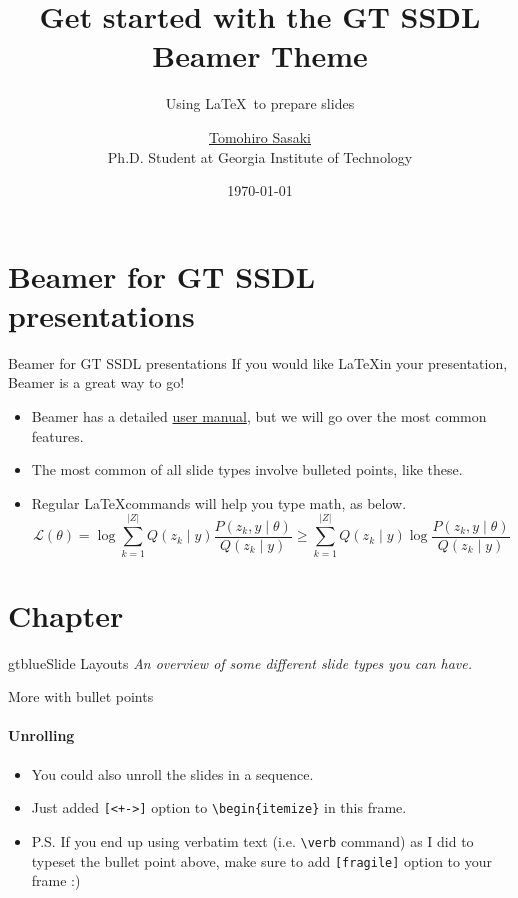 \documentclass{beamer}
\title{Get started with the GT SSDL Beamer Theme}
\subtitle{Using \LaTeX\ to prepare slides}
\author[Tomohiro Sasaki]{\href{mailto:tomohiro.sasaki@gatech.edu}{Tomohiro Sasaki}\\Ph.D. Student at Georgia Institute of Technology}
\date{\today}
\newcommand{\hrefcol}[2]{\textcolor{gtbuzzgold}{\href{#1}{#2}}}
\begin{document}
\maketitle


\frame{\vspace{-15mm}\tableofcontents[hideallsubsections]}

\section{Beamer for GT SSDL presentations}

\begin{frame}{Beamer for GT SSDL presentations}
If you would like \LaTeX in your presentation, Beamer is a great way to go!
\begin{itemize}
\item Beamer has a detailed
\hrefcol{https://www.ctan.org/tex-archive/macros/latex/contrib/beamer/doc/beameruserguide.pdf}{user
 manual}, but we will go over the most common features.
\item The most common of all slide types involve bulleted points, like these.
\item Regular \LaTeX commands will help you type math, as below\footnotemark.
\begin{equation*}
\mathcal{L} (\theta) = \log \sum_{k=1}^{\lvert Z \rvert} Q(z_k \mid y) \frac{P( z_k,  y \mid \theta)}{Q(z_k \mid y)} \geq \sum_{k=1}^{\lvert Z \rvert} Q(z_k \mid y) \log \frac{P( z_k,  y \mid \theta)}{Q(z_k \mid y)}
\end{equation*}
\end{itemize}
\end{frame}


\section{Chapter}
\begin{chapter}{gtblue}{Slide Layouts}
\textit{An overview of some different slide types you can have.}
\end{chapter}

\begin{frame}[fragile]{More with bullet points}
\framesubtitle{Unrolling}
\begin{itemize}[<+->]
\item You could also unroll the slides in a sequence.
\item Just added \verb|[<+->]| option to \verb|\begin{itemize}| in this frame.
\item P.S. If you end up using verbatim text (i.e. \verb|\verb| command) as I did to typeset the bullet point above, make sure to add \verb|[fragile]| option to your frame :)
\end{itemize}
\end{frame}
\end{document}
